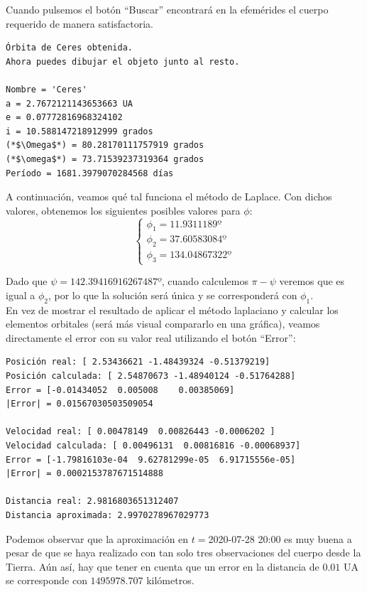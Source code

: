 \documentclass[11pt]{book}
\begin{document}
Cuando pulsemos el botón ``Buscar'' encontrará en la efemérides el cuerpo requerido de manera satisfactoria.
\begin{lstlisting}[style=Console]
Órbita de Ceres obtenida.
Ahora puedes dibujar el objeto junto al resto.

Nombre = 'Ceres'
a = 2.7672121143653663 UA
e = 0.07772816968324102
i = 10.588147218912999 grados
(*$\Omega$*) = 80.28170111757919 grados
(*$\omega$*) = 73.71539237319364 grados
Período = 1681.3979070284568 días
\end{lstlisting}

A continuación, veamos qué tal funciona el método de Laplace. Con dichos valores, obtenemos los siguientes posibles valores para $\phi$:
\[
\left\{
\begin{array}{l}
\phi_1=11.9311189º\\
\phi_2=37.60583084º\\
\phi_3=134.04867322º
\end{array}
\right.
\]

Dado que $\psi=142.39416916267487º$, cuando calculemos $\pi-\psi$ veremos que es igual a $\phi_2$, por lo que la solución será única y se corresponderá con $\phi_1$.\\

En vez de mostrar el resultado de aplicar el método laplaciano y calcular los elementos orbitales (será más visual compararlo en una gráfica), veamos directamente el error con su valor real utilizando el botón ``Error'':
\begin{lstlisting}[style=Console]
Posición real: [ 2.53436621 -1.48439324 -0.51379219]
Posición calculada: [ 2.54870673 -1.48940124 -0.51764288]
Error = [-0.01434052  0.005008    0.00385069]
|Error| = 0.01567030503509054

Velocidad real: [ 0.00478149  0.00826443 -0.0006202 ]
Velocidad calculada: [ 0.00496131  0.00816816 -0.00068937]
Error = [-1.79816103e-04  9.62781299e-05  6.91715556e-05]
|Error| = 0.0002153787671514888

Distancia real: 2.9816803651312407
Distancia aproximada: 2.9970278967029773
\end{lstlisting}

Podemos observar que la aproximación en $t=$2020-07-28 20:00 es muy buena a pesar de que se haya realizado con tan solo tres observaciones del cuerpo desde la Tierra. Aún así, hay que tener en cuenta que un error en la distancia de $0.01$ UA se corresponde con $1495978.707$ kilómetros.\\
\end{document}
